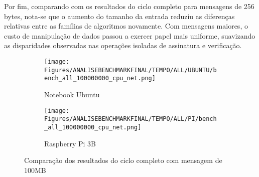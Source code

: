 Por fim, comparando com os resultados do ciclo completo para mensagens de 256 bytes, nota-se que o aumento do tamanho da entrada reduziu as diferenças relativas entre as famílias de algoritmos novamente. Com mensagens maiores, o custo de manipulação de dados passou a exercer papel mais uniforme, suavizando as disparidades observadas nas operações isoladas de assinatura e verificação.


\begin{figure}[h!]
    \centering
    \begin{subfigure}{1\textwidth}
        \texttt{[image: Figures/ANALISEBENCHMARKFINAL/TEMPO/ALL/UBUNTU/bench\_all\_100000000\_cpu\_net.png]}
        \caption{Notebook Ubuntu}
    \end{subfigure}
    \par\vspace{1em}
    \begin{subfigure}{1\textwidth}
        \texttt{[image: Figures/ANALISEBENCHMARKFINAL/TEMPO/ALL/PI/bench\_all\_100000000\_cpu\_net.png]}
        \caption{Raspberry Pi 3B}
    \end{subfigure}
    \caption{Comparação dos resultados do ciclo completo com mensagem de 100MB}
    \label{fig:BENCHFINAL_ALL100MB_TIME}
\end{figure}


